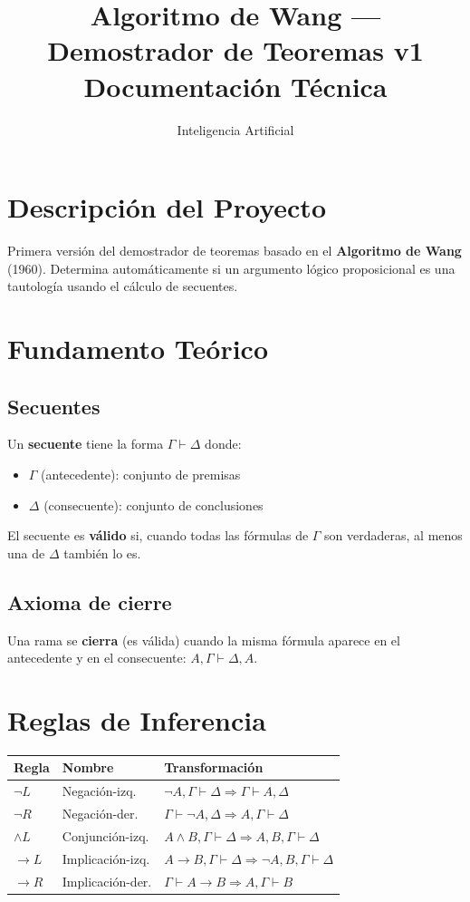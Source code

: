 \documentclass[12pt,a4paper]{article}
\title{\textbf{Algoritmo de Wang --- Demostrador de Teoremas v1}\\
  \large Documentación Técnica}
\author{Inteligencia Artificial}
\date{}
\begin{document}
\maketitle
\tableofcontents
\newpage

\section{Descripción del Proyecto}
Primera versión del demostrador de teoremas basado en el \textbf{Algoritmo de Wang} (1960). Determina automáticamente si un argumento lógico proposicional es una tautología usando el cálculo de secuentes.

\section{Fundamento Teórico}

\subsection{Secuentes}
Un \textbf{secuente} tiene la forma $\Gamma \vdash \Delta$ donde:
\begin{itemize}
  \item $\Gamma$ (antecedente): conjunto de premisas
  \item $\Delta$ (consecuente): conjunto de conclusiones
\end{itemize}
El secuente es \textbf{válido} si, cuando todas las fórmulas de $\Gamma$ son verdaderas, al menos una de $\Delta$ también lo es.

\subsection{Axioma de cierre}
Una rama se \textbf{cierra} (es válida) cuando la misma fórmula aparece en el antecedente y en el consecuente: $A, \Gamma \vdash \Delta, A$.

\section{Reglas de Inferencia}

\begin{center}
\begin{tabular}{|l|l|l|}
\hline
\textbf{Regla} & \textbf{Nombre} & \textbf{Transformación} \\
\hline
$\neg L$ & Negación-izq. & $\neg A, \Gamma \vdash \Delta \Rightarrow \Gamma \vdash A, \Delta$ \\
$\neg R$ & Negación-der. & $\Gamma \vdash \neg A, \Delta \Rightarrow A, \Gamma \vdash \Delta$ \\
$\wedge L$ & Conjunción-izq. & $A \wedge B, \Gamma \vdash \Delta \Rightarrow A, B, \Gamma \vdash \Delta$ \\
$\rightarrow L$ & Implicación-izq. & $A \rightarrow B, \Gamma \vdash \Delta \Rightarrow \neg A, B, \Gamma \vdash \Delta$ \\
$\rightarrow R$ & Implicación-der. & $\Gamma \vdash A \rightarrow B \Rightarrow A, \Gamma \vdash B$ \\
\hline
\end{tabular}
\end{center}
\end{document}
